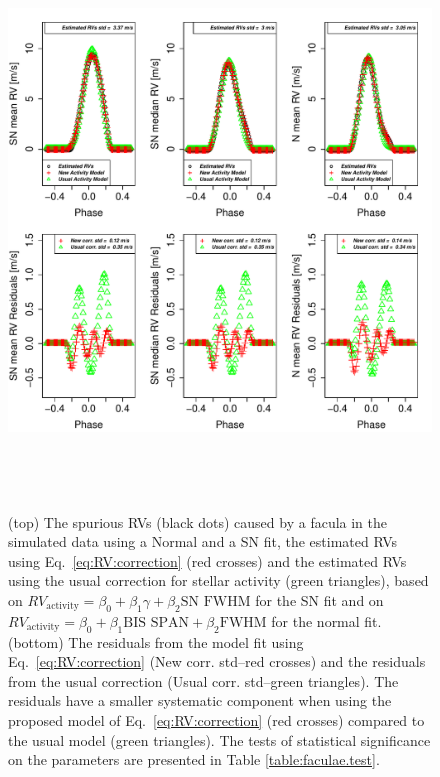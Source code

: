 \documentclass{aa}
\begin{document}
\begin{figure}[htbp]
\begin{center}
\includegraphics[height = 6in]{FACULAE_NEW_CORRECTION_[3]CorrectionActivity_RadialVelocity_vs_time.pdf} 
   \caption{(top) The spurious RVs (black dots) caused by a facula in the simulated data using a Normal and a SN fit, the estimated RVs using Eq.~\ref{eq:RV:correction} (red crosses) and the estimated RVs using the usual correction for stellar activity (green triangles), based on $RV_{\text{activity}}=\beta_0+\beta_1 \gamma + \beta_2 \text{SN FWHM}$ for the SN fit and on $RV_{\text{activity}}=\beta_0+\beta_1 \text{BIS SPAN} + \beta_2 \text{FWHM}$ for the normal fit.    
 (bottom) The residuals from the model fit using Eq.~\ref{eq:RV:correction} (New corr. std--red crosses) and the residuals from the usual correction (Usual corr. std--green triangles). The residuals have a smaller systematic component when using the proposed model of 
  Eq.~\ref{eq:RV:correction} (red crosses) compared to the usual model (green triangles).
The tests of statistical significance on the parameters are presented in Table \ref{table:faculae.test}.
}\label{fig:faculae.correction}
\end{center}
\end{figure}
\end{document}
